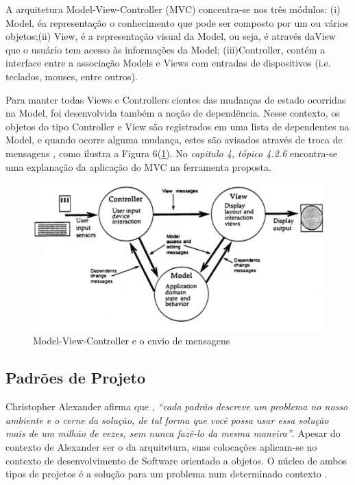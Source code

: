 A arquitetura Model-View-Controller (MVC) concentra-se nos três módulos: (i) Model, éa representação o conhecimento que pode ser composto por um ou vários objetos;(ii) View, é a representação visual da Model, ou seja, é através daView que o usuário tem acesso às informações da Model; (iii)Controller, contém a interface entre a associação Models e Views com entradas de dispositivos (i.e. teclados, mouses, entre outros)\cite[p. 2]{krasner1988}.

Para manter todas Views e Controllers cientes das mudanças de estado ocorridas na Model, foi desenvolvida também a noção de dependência. Nesse contexto, os objetos do tipo Controller e View são registrados em uma lista de dependentes na Model, e quando ocorre alguma mudança, estes são avisados através de troca de mensagens \cite[p. 2]{krasner1988}, como ilustra a Figura 6(\ref{f06}). No \textit{capitulo 4, tópico 4.2.6} encontra-se uma explanação da aplicação do MVC na ferramenta proposta.

\begin{figure}[h]
\centering
\label{f06}
\includegraphics[width=1\textwidth]{figuras/f06}
\caption{Model-View-Controller e o envio de mensagens}

\end{figure}



\subsection{Padrões de Projeto}

Christopher Alexander afirma que , \textit{“cada padrão descreve um problema no nosso ambiente e o cerne da solução, de tal forma que você possa usar essa solução mais de um milhão de vezes, sem nunca fazê-lo da mesma maneira”}. Apesar do contexto de Alexander ser o da arquitetura, suas colocações aplicam-se no contexto de desenvolvimento de Software orientado a objetos. O núcleo de ambos tipos de projetos é a solução para um problema num determinado contexto \cite[p.19]{gamma2000}.

